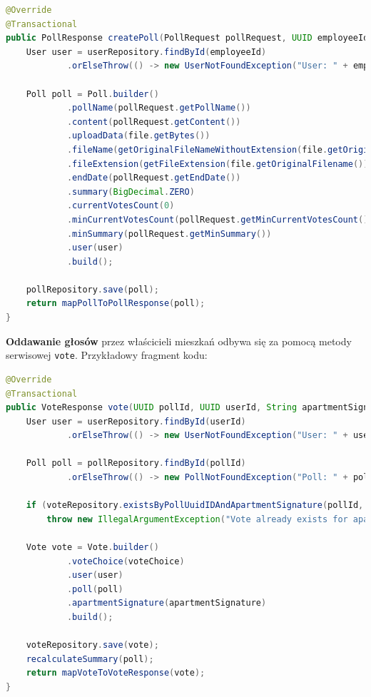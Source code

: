 \begin{lstlisting}[language=Java, style=JavaStyle, caption=Fragment metody \texttt{createPoll}]
@Override
@Transactional
public PollResponse createPoll(PollRequest pollRequest, UUID employeeId, MultipartFile file) throws UserNotFoundException, IOException {
    User user = userRepository.findById(employeeId)
            .orElseThrow(() -> new UserNotFoundException("User: " + employeeId + " not found"));

    Poll poll = Poll.builder()
            .pollName(pollRequest.getPollName())
            .content(pollRequest.getContent())
            .uploadData(file.getBytes())
            .fileName(getOriginalFileNameWithoutExtension(file.getOriginalFilename()))
            .fileExtension(getFileExtension(file.getOriginalFilename()))
            .endDate(pollRequest.getEndDate())
            .summary(BigDecimal.ZERO)
            .currentVotesCount(0)
            .minCurrentVotesCount(pollRequest.getMinCurrentVotesCount())
            .minSummary(pollRequest.getMinSummary())
            .user(user)
            .build();

    pollRepository.save(poll);
    return mapPollToPollResponse(poll);
}
\end{lstlisting}

\textbf{Oddawanie głosów} przez właścicieli mieszkań odbywa się za pomocą metody serwisowej \texttt{vote}. Przykładowy fragment kodu:

\begin{lstlisting}[language=Java, style=JavaStyle, caption=Fragment metody \texttt{vote}]
@Override
@Transactional
public VoteResponse vote(UUID pollId, UUID userId, String apartmentSignature, VoteChoice voteChoice) throws UserNotFoundException, PollNotFoundException, ApartmentNotFoundException {
    User user = userRepository.findById(userId)
            .orElseThrow(() -> new UserNotFoundException("User: " + userId + " not found"));

    Poll poll = pollRepository.findById(pollId)
            .orElseThrow(() -> new PollNotFoundException("Poll: " + pollId + " not found"));

    if (voteRepository.existsByPollUuidIDAndApartmentSignature(pollId, apartmentSignature))
        throw new IllegalArgumentException("Vote already exists for apartment");

    Vote vote = Vote.builder()
            .voteChoice(voteChoice)
            .user(user)
            .poll(poll)
            .apartmentSignature(apartmentSignature)
            .build();

    voteRepository.save(vote);
    recalculateSummary(poll);
    return mapVoteToVoteResponse(vote);
}
\end{lstlisting}

